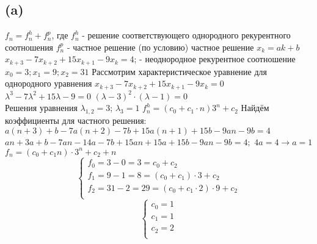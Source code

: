 \documentclass[12pt]{article}
\begin{document}
	\subsection*{(a)}
	$f_{n} = f_{n}^{h} + f_{n}^{p}$, где \newline
	$f_{n}^{h}$ - решение соответствующего однородного рекурентного соотношения \newline
	$f_{n}^{p}$ - частное решение \newline
	(по условию) частное решение $x_{k} = ak + b$ \newline
	$x_{k+3} - 7x_{k+2} + 15x_{k+1} -9x_{k} = 4$; - неоднородное рекурентное соотношение\newline
	$x_{0} = 3; x_{1} = 9; x_{2} = 31$ \newline
	Рассмотрим характеристическое уравнение для однородного уравнения $x_{k+3} - 7x_{k+2} + 15x_{k+1} -9x_{k} = 0$ \newline
	${\lambda}^3 -7{\lambda}^2 + 15{\lambda} - 9 = 0$ \newline
	${({\lambda} - 3)}^2\cdot({\lambda} - 1) = 0$ \\
	Решения уравнения $\lambda_{1,2} = 3$; $\lambda_{3} = 1$ \newline
	$f_{n}^{h} = (c_{0} + c_{1}\cdot n){3}^n + c_{2}$ \newline
	Найдём коэффициенты для частного решения: \newline
	$a(n+3) + b - 7a(n+2) - 7b + 15a(n+1) + 15b - 9an - 9b = 4$ \newline
	$an + 3a +b-7an -14a-7b + 15an + 15a + 15b -9an - 9b = 4;$
	$4a = 4 \rightarrow a = 1$ \\
	$f_{n} = (c_{0} + c_{1}n)\cdot{3}^n + c_{2} + n$
	$$  
	\left\{  
	\begin{array}{lcl}  
	f_{0} = \textit{3} - 0 = 3 = c_{0} + c_{2} \\  
	f_{1} = \textit{9} - 1 = 8 = (c_{0} + c_{1})\cdot 3 + c_{2}\\
	f_{2} = \textit{31} - 2 = 29 = (c_{0} + c_{1}\cdot 2)\cdot 9 + c_{2}\\
	\end{array}   
	\right.  
	$$  	
	$$  
	\left\{  
	\begin{array}{lcl}  
	c_{0} = 1\\
	c_{1} = 1 \\
	c_{2} = 2\\
	\end{array}   
	\right.  
	$$ 
	 \\
\end{document}
